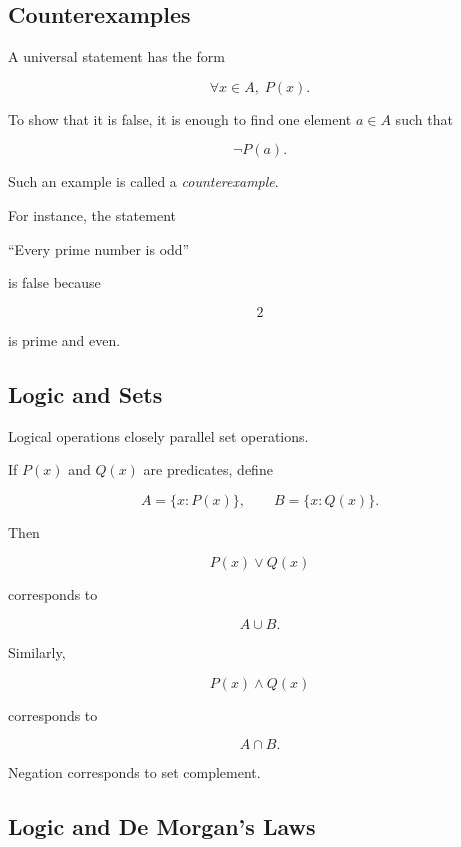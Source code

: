 \subsection{Counterexamples}
\label{subsec:logic-counterexamples}

A universal statement has the form

\[ \forall x\in A,\;P(x). \]

To show that it is false, it is enough to find one element \(a\in A\) such
that

\[ \neg P(a). \]

Such an example is called a \emph{counterexample}.

For instance, the statement

\begin{center}
``Every prime number is odd''
\end{center}

is false because

\[ 2 \]

is prime and even.

\subsection{Logic and Sets}
\label{subsec:logic-and-sets}

Logical operations closely parallel set operations.

If \(P(x)\) and \(Q(x)\) are predicates, define

\[ A=\{x:P(x)\},\qquad B=\{x:Q(x)\}. \]

Then

\[ P(x)\lor Q(x) \]

corresponds to

\[ A\cup B. \]

Similarly,

\[ P(x)\land Q(x) \]

corresponds to

\[ A\cap B. \]

Negation corresponds to set complement.

\subsection{Logic and De Morgan's Laws}
\label{subsec:logic-set-de-morgan}

